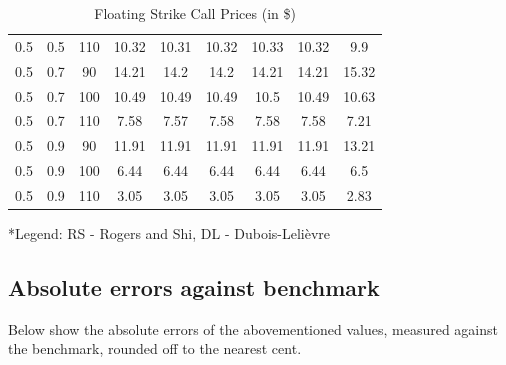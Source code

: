 \documentclass{article}
\begin{document}
\begin{table}[H]
\begin{tabular}{|c|c|c|c|c|c|c|c|c|}
  0.5 & 0.5 & 110 & 10.32 & 10.31 & 10.32 & 10.33 & 10.32 & 9.9 \\
  0.5 & 0.7 & 90 & 14.21 & 14.2 & 14.2 & 14.21 & 14.21 & 15.32 \\
  0.5 & 0.7 & 100 & 10.49 & 10.49 & 10.49 & 10.5 & 10.49 & 10.63 \\
  0.5 & 0.7 & 110 & 7.58 & 7.57 & 7.58 & 7.58 & 7.58 & 7.21 \\
  0.5 & 0.9 & 90 & 11.91 & 11.91 & 11.91 & 11.91 & 11.91 & 13.21 \\
  0.5 & 0.9 & 100 & 6.44 & 6.44 & 6.44 & 6.44 & 6.44 & 6.5 \\
  0.5 & 0.9 & 110 & 3.05 & 3.05 & 3.05 & 3.05 & 3.05 & 2.83 \\
  \hline
  \end{tabular}
  \caption{Floating Strike Call Prices (in \$)}
  \label{table:name}
\end{table}
\scriptsize
*Legend: RS - Rogers and Shi, DL - Dubois-Leli\`{e}vre
\normalsize

\subsection{Absolute errors against benchmark}
Below show the absolute errors of the abovementioned values, measured against the benchmark, rounded off to the nearest cent.
\end{document}
